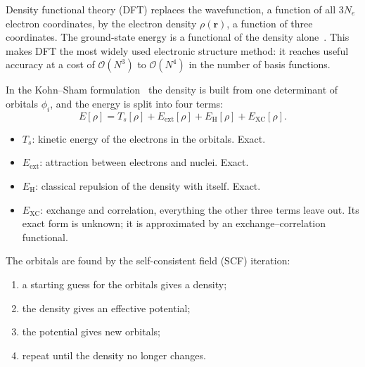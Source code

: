Density functional theory (DFT) replaces the wavefunction, a function of all
$3N_e$ electron coordinates, by the electron density $\rho(\mathbf{r})$, a
function of three coordinates. The ground-state energy is a functional of
the density alone~\cite{hohenberg1964}. This makes DFT the most widely used
electronic structure method: it reaches useful accuracy at a cost of
$\mathcal{O}(N^3)$ to $\mathcal{O}(N^4)$ in the number of basis functions.

In the Kohn--Sham formulation~\cite{kohn1965} the density is built from one
determinant of orbitals $\phi_i$, and the energy is split into four terms:
%
\begin{equation}
  E[\rho] = T_s[\rho] + E_\text{ext}[\rho] + E_\text{H}[\rho] + E_\text{XC}[\rho] .
  \label{eq:ks-energy}
\end{equation}

\begin{itemize}
  \item $T_s$: kinetic energy of the electrons in the orbitals. Exact.
  \item $E_\text{ext}$: attraction between electrons and nuclei. Exact.
  \item $E_\text{H}$: classical repulsion of the density with itself. Exact.
  \item $E_\text{XC}$: exchange and correlation, everything the other three
    terms leave out. Its exact form is unknown; it is approximated by an
    exchange--correlation functional.
\end{itemize}

The orbitals are found by the self-consistent field (SCF) iteration:

\begin{enumerate}
  \item a starting guess for the orbitals gives a density;
  \item the density gives an effective potential;
  \item the potential gives new orbitals;
  \item repeat until the density no longer changes.
\end{enumerate}

